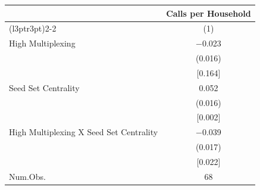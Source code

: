 \begin{table}
\centering
\begin{tabular}[t]{lc}
\toprule
\multicolumn{1}{c}{ } & \multicolumn{1}{c}{Calls per Household} \\
\cmidrule(l{3pt}r{3pt}){2-2}
  & (1)\\
\midrule
High Multiplexing & \num{-0.023}\\
 & \vphantom{1} (\num{0.016})\\
 & {}[\num{0.164}]\\
Seed Set Centrality & \num{0.052}\\
 & (\num{0.016})\\
 & {}[\num{0.002}]\\
High Multiplexing X Seed Set Centrality & \num{-0.039}\\
 & (\num{0.017})\\
 & {}[\num{0.022}]\\
\midrule
Num.Obs. & \num{68}\\
\bottomrule
\end{tabular}
\end{table}
